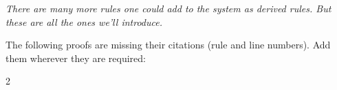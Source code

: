 \emph{There are many more rules one could add to the system as derived rules. But these are all the ones we'll introduce.}
\newpage
\begin{practiceproblems}
\solutions
\problempart
\label{pr:justifyTFLproof}
The following proofs are missing their citations (rule and line numbers). Add them wherever they are required:
\begin{multicols}{2}
\begin{fitchproof}
 {}
 {}
\end{fitchproof}
%
\vfill
%
\begin{fitchproof}
\open
\close
\end{fitchproof}
%
\columnbreak
%
\begin{fitchproof}
\open
\close
{}
\open
\close
{}
\end{fitchproof}
\end{multicols}


\end{practiceproblems}
